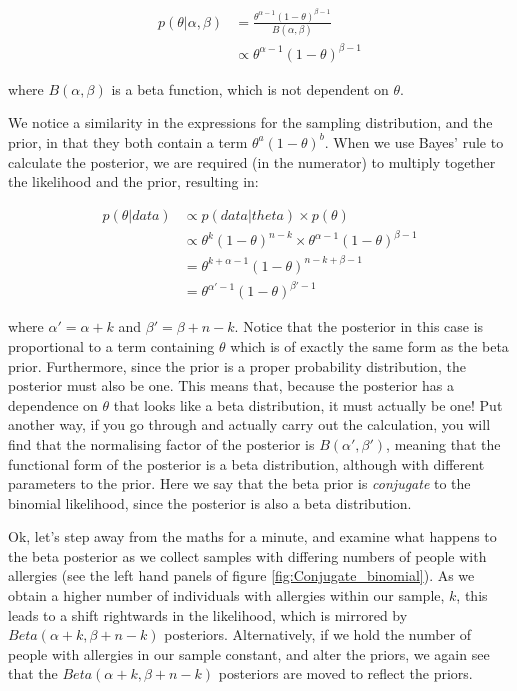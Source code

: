 \documentclass[11pt,fullpage]{book}
\begin{document}
\begin{equation}
\begin{align}
p(\theta|\alpha,\beta) &= \frac{\theta^{\alpha-1}(1-\theta)^{\beta-1}}{B(\alpha,\beta)}\\
&\propto \theta^{\alpha-1}(1-\theta)^{\beta-1}
\end{align}
\end{equation}

where $B(\alpha,\beta)$ is a beta function, which is not dependent on $\theta$.

We notice a similarity in the expressions for the sampling distribution, and the prior, in that they both contain a term $\theta^a (1-\theta)^b$. When we use Bayes' rule to calculate the posterior, we are required (in the numerator) to multiply together the likelihood and the prior, resulting in:

\begin{equation}
\begin{align}
p(\theta|data) &\propto p(data|theta) \times p(\theta)\\
&\propto \theta^k (1-\theta)^{n-k} \times \theta^{\alpha-1}(1-\theta)^{\beta-1}\\
&= \theta^{k+ \alpha - 1} (1-\theta)^{n-k + \beta - 1}\\
&= \theta^{\alpha' - 1}(1-\theta)^{\beta'-1}
\end{align}
\end{equation}

where $\alpha'=\alpha + k$ and $\beta'= \beta + n - k$. Notice that the posterior in this case is proportional to a term containing $\theta$ which is of exactly the same form as the beta prior. Furthermore, since the prior is a proper probability distribution, the posterior must also be one. This means that, because the posterior has a dependence on $\theta$ that looks like a beta distribution, it must actually be one! Put another way, if you go through and actually carry out the calculation, you will find that the normalising factor of the posterior is $B(\alpha',\beta')$, meaning that the functional form of the posterior is a beta distribution, although with different parameters to the prior. Here we say that the beta prior is \textit{conjugate} to the binomial likelihood, since the posterior is also a beta distribution.

Ok, let's step away from the maths for a minute, and examine what happens to the beta posterior as we collect samples with differing numbers of people with allergies (see the left hand panels of figure \ref{fig:Conjugate_binomial}). As we obtain a higher number of individuals with allergies within our sample, $k$, this leads to a shift rightwards in the likelihood, which is mirrored by $Beta(\alpha + k,\beta + n - k)$ posteriors. Alternatively, if we hold the number of people with allergies in our sample constant, and alter the priors, we again see that the $Beta(\alpha + k,\beta + n - k)$ posteriors are moved to reflect the priors.
\end{document}
